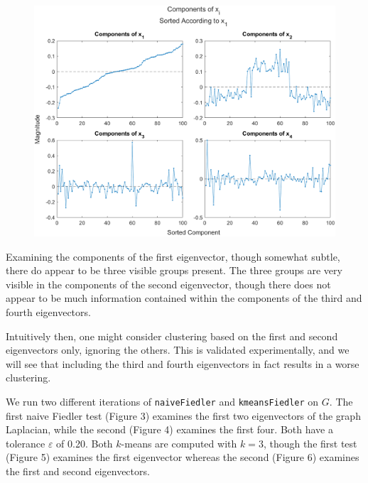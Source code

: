 \documentclass[11pt, letterpaper]{article}
\theoremstyle{perchance}
\begin{document}
    \begin{figure}[h!]
        \centering
        \includegraphics[width=0.75\linewidth]{images/comp.png}
    \end{figure}

    Examining the components of the first eigenvector, though somewhat subtle, there do appear to be three visible groups present. The three groups are very visible in the components of the second eigenvector, though there does not appear to be much information contained within the components of the third and fourth eigenvectors. 
    
    Intuitively then, one might consider clustering based on the first and second eigenvectors only, ignoring the others. This is validated experimentally, and we will see that including the third and fourth eigenvectors in fact results in a worse clustering.
    
    We run two different iterations of \texttt{naiveFiedler} and \texttt{kmeansFiedler} on $G$. The first naive Fiedler test (Figure 3) examines the first two eigenvectors of the graph Laplacian, while the second (Figure 4) examines the first four. Both have a tolerance $\varepsilon$ of 0.20. Both $k$-means are computed with $k=3$, though the first test (Figure 5) examines the first eigenvector whereas the second (Figure 6) examines the first and second eigenvectors.
\end{document}
